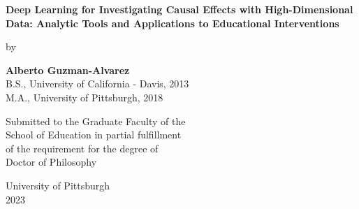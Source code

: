 
   \begin{center}
   \begin{spacing}{1}

        \textbf{Deep Learning for Investigating Causal Effects with High-Dimensional Data: Analytic Tools and Applications to Educational Interventions}
            
        \vspace{1.5cm}
        \vfill
        by
            
        \textbf{Alberto Guzman-Alvarez}\\
        B.S., University of California - Davis, 2013\\
        M.A., University of Pittsburgh, 2018\\
        
        \vfill
        
        Submitted to the Graduate Faculty of the\\
        School of Education in partial fulfillment\\
        of the requirement for the degree of\\
        Doctor of Philosophy
            
        \vfill
            
        \vspace{0.8cm}
        
        \vspace{0.8cm}
        
        University of Pittsburgh\\ 
        2023
    \end{spacing}        
    \end{center}

	
	